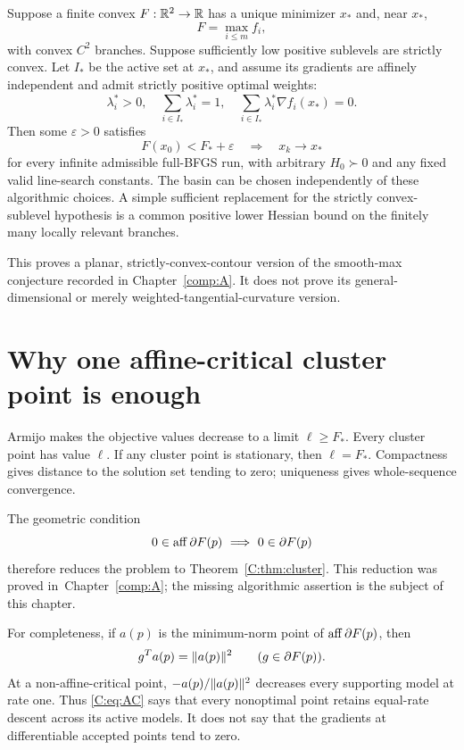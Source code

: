 \begin{corollary}\label{C:cor:max}
Suppose a finite convex $F:\mathbb R^2\to\mathbb R$ has a unique minimizer $x_*$ and, near $x_*$,
\[
 F=\max_{i\le m}f_i,
\]
with convex $C^2$ branches. Suppose sufficiently low positive sublevels are strictly convex. Let $I_*$ be the active set at $x_*$, and assume its gradients are affinely independent and admit strictly positive optimal weights:
\begin{equation}\label{C:eq:nondeg}
 \lambda_i^*>0,\quad \sum_{i\in I_*}\lambda_i^*=1,\quad
 \sum_{i\in I_*}\lambda_i^*\nabla f_i(x_*)=0.
\end{equation}
Then some $\varepsilon>0$ satisfies
\[
 F(x_0)<F_*+\varepsilon\quad\Longrightarrow\quad x_k\to x_*
\]
for every infinite admissible full-BFGS run, with arbitrary $H_0\succ0$ and any fixed valid line-search constants. The basin can be chosen independently of these algorithmic choices. A simple sufficient replacement for the strictly convex-sublevel hypothesis is a common positive lower Hessian bound on the finitely many locally relevant branches.
\end{corollary}

This proves a planar, strictly-convex-contour version of the smooth-max conjecture recorded in Chapter~\ref{comp:A}. It does not prove its general-dimensional or merely weighted-tangential-curvature version.


\setcounter{section}{1}
\setcounter{theorem}{3}
\setcounter{equation}{3}


\section{Why one affine-critical cluster point is enough}
Armijo makes the objective values decrease to a limit $\ell\ge F_*$. Every cluster point has value $\ell$. If any cluster point is stationary, then $\ell=F_*$. Compactness gives distance to the solution set tending to zero; uniqueness gives whole-sequence convergence.

The geometric condition
\begin{equation}\label{C:eq:AC}
 0\in\operatorname{aff}\partial F(p)\ \Longrightarrow\ 0\in\partial F(p)
\end{equation}
therefore reduces the problem to Theorem~\ref{C:thm:cluster}. This reduction was proved in~Chapter~\ref{comp:A}; the missing algorithmic assertion is the subject of this chapter.

For completeness, if $a(p)$ is the minimum-norm point of $\operatorname{aff}\partial F(p)$, then
\[
 g^Ta(p)=\lVert a(p)\rVert^2\qquad(g\in\partial F(p)).
\]
At a non-affine-critical point, $-a(p)/\lVert a(p)\rVert^2$ decreases every supporting model at rate one. Thus \eqref{C:eq:AC} says that every nonoptimal point retains equal-rate descent across its active models. It does not say that the gradients at differentiable accepted points tend to zero.



